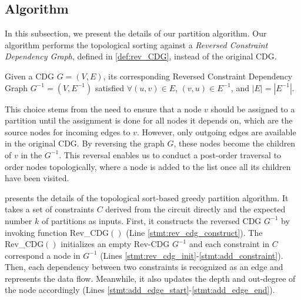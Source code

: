 \subsection{Algorithm}
In this subsection, we present the details of our partition algorithm. Our algorithm performs the topological sorting against a \emph{Reversed Constraint Dependency Graph}, defined in \cref{def:rev_CDG}, instead of the original CDG. 
\begin{definition} \label{def:rev_CDG}
Given a CDG \( G = (V, E) \), its corresponding Reversed Constraint Dependency Graph \( G^{-1} = (V, E^{-1}) \) satisfied $\forall (u, v) \in E$, \( (v, u) \in E^{-1} \), and \( |E| = |E^{-1}| \). 
\label{def:rcdg}
\end{definition}
\noindent This choice stems from the need to ensure that a node $v$ should be assigned to a partition until the assignment is done for all nodes it depends on, which are the source nodes for incoming edges to $v$. However, only outgoing edges are available in the original CDG. By reversing the graph $G$, these nodes become the children of $v$ in the $G^{-1}$. This reversal enables us to conduct a post-order traversal to order nodes topologically, where a node is added to the list once all its children have been visited. 







 presents the details of the topological sort-based greedy partition algorithm. It takes a set of constraints $C$ derived from the circuit directly and the expected number $k$ of partitions as inputs. First, it constructs the reversed CDG $G^{-1}$ by invoking function Rev\_CDG$()$ (Line \ref{stmt:rev_cdg_construct}). The Rev\_CDG$()$ initializes an empty Rev-CDG $G^{-1}$ and each constraint in $C$ correspond a node in $G^{-1}$ (Lines \ref{stmt:rev_cdg_init}-\ref{stmt:add_constraint}). Then, each dependency between two constraints is recognized as an edge and represents the data flow. Meanwhile, it also updates the depth and out-degree of the node accordingly (Lines \ref{stmt:add_edge_start}-\ref{stmt:add_edge_end}). 

